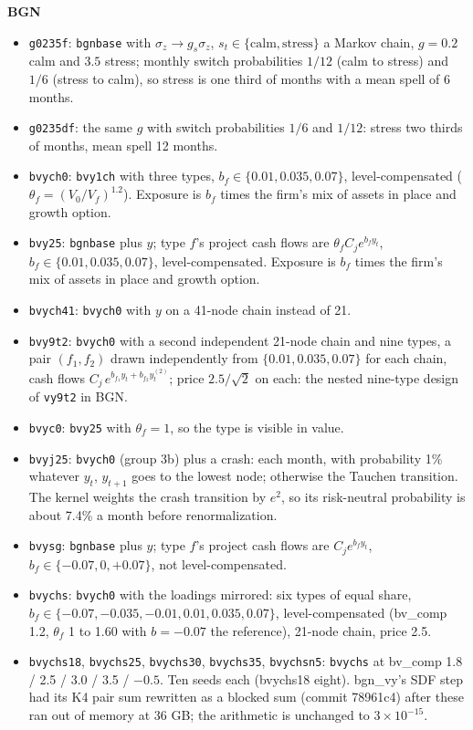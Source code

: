 \documentclass[11pt]{article}
\begin{document}
\noindent\textbf{BGN}
\begin{itemize}
\item \texttt{g0235f}: \texttt{bgnbase} with $\sigma_z\to g_s\sigma_z$, $s_t\in\{\text{calm},\text{stress}\}$ a Markov chain, $g=0.2$ calm and $3.5$ stress; monthly switch probabilities $1/12$ (calm to stress) and $1/6$ (stress to calm), so stress is one third of months with a mean spell of 6 months.
\item \texttt{g0235df}: the same $g$ with switch probabilities $1/6$ and $1/12$: stress two thirds of months, mean spell 12 months.
\item \texttt{bvych0}: \texttt{bvy1ch} with three types, $b_f\in\{0.01,0.035,0.07\}$, level-compensated ($\theta_f=(V_0/V_f)^{1.2}$). Exposure is $b_f$ times the firm's mix of assets in place and growth option.
\item \texttt{bvy25}: \texttt{bgnbase} plus $y$; type $f$'s project cash flows are $\theta_f C_j e^{b_f y_t}$, $b_f\in\{0.01,0.035,0.07\}$, level-compensated. Exposure is $b_f$ times the firm's mix of assets in place and growth option.
\item \texttt{bvych41}: \texttt{bvych0} with $y$ on a 41-node chain instead of 21.
\item \texttt{bvy9t2}: \texttt{bvych0} with a second independent 21-node chain and nine types, a pair $(f_1,f_2)$ drawn independently from $\{0.01,0.035,0.07\}$ for each chain, cash flows $C_j\,e^{b_{f_1}y_t+b_{f_2}y^{(2)}_t}$; price $2.5/\sqrt2$ on each: the nested nine-type design of \texttt{vy9t2} in BGN.
\item \texttt{bvyc0}: \texttt{bvy25} with $\theta_f=1$, so the type is visible in value.
\item \texttt{bvyj25}: \texttt{bvych0} (group 3b) plus a crash: each month, with probability 1\% whatever $y_t$, $y_{t+1}$ goes to the lowest node; otherwise the Tauchen transition. The kernel weights the crash transition by $e^{2}$, so its risk-neutral probability is about 7.4\% a month before renormalization.
\item \texttt{bvysg}: \texttt{bgnbase} plus $y$; type $f$'s project cash flows are $C_j e^{b_f y_t}$, $b_f\in\{-0.07,0,+0.07\}$, not level-compensated.
\item \texttt{bvychs}: \texttt{bvych0} with the loadings mirrored: six types of equal share, $b_f\in\{-0.07,-0.035,-0.01,0.01,0.035,0.07\}$, level-compensated (bv\_comp 1.2, $\theta_f$ 1 to 1.60 with $b=-0.07$ the reference), 21-node chain, price 2.5.
\item \texttt{bvychs18}, \texttt{bvychs25}, \texttt{bvychs30}, \texttt{bvychs35}, \texttt{bvychsn5}: \texttt{bvychs} at bv\_comp 1.8 / 2.5 / 3.0 / 3.5 / $-0.5$. Ten seeds each (bvychs18 eight). bgn\_vy's SDF step had its K4 pair sum rewritten as a blocked sum (commit 78961c4) after these ran out of memory at 36 GB; the arithmetic is unchanged to $3\times10^{-15}$.

\end{itemize}
\end{document}
